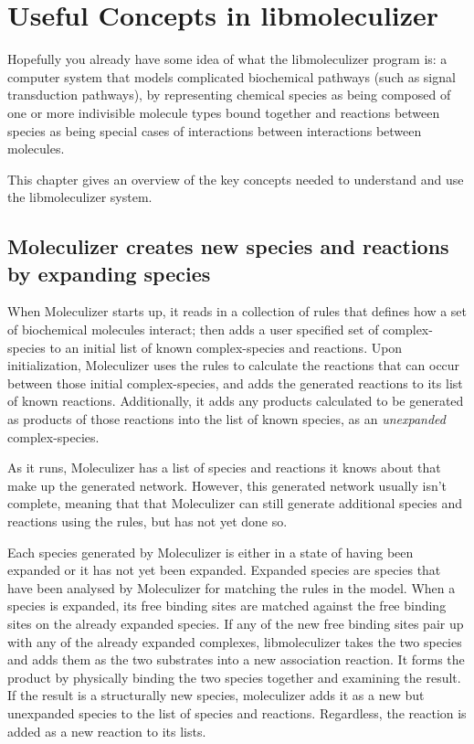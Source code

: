 \chapter{Useful Concepts in libmoleculizer}
\label{chap:conceptualOverviewChapter}

Hopefully you already have some idea of what the libmoleculizer
program is: a computer system that models complicated biochemical
pathways (such as signal transduction pathways), by representing chemical
species as being composed of one or more indivisible molecule types
bound together and reactions between species as being special cases of
interactions between interactions between molecules.  

This chapter gives an overview of the key concepts needed to
understand and use the libmoleculizer system.  

\section{Moleculizer creates new species and reactions by expanding
  species}

When Moleculizer starts up, it reads in a collection of rules that
defines how a set of biochemical molecules interact; then adds a user
specified set of complex-species to an initial list of known
complex-species and reactions.  Upon initialization, Moleculizer uses
the rules to calculate the reactions that can occur between those initial
complex-species, and adds the generated reactions to its list of
known reactions.  Additionally, it adds any products calculated to be
generated as products of those reactions into the list of known species,
as an {\it unexpanded} complex-species.

As it runs, Moleculizer has a list of species and reactions it
knows about that make up the generated network.  However, this
generated network usually isn't complete, meaning that that
Moleculizer can still generate additional species and reactions using
the rules, but has not yet done so.  

Each species generated by Moleculizer is either in a state of having
been expanded or it has not yet been expanded.  Expanded species are
species that have been analysed by Moleculizer for matching the rules
in the model.  When a species is expanded, its free binding sites are
matched against the free binding sites on the already expanded
species.  If any of the new free binding sites pair up with any of the
already expanded complexes, libmoleculizer takes the two species and
adds them as the two substrates into a new association reaction.  It
forms the product by physically binding the two species together and
examining the result.  If the result is a structurally new species,
moleculizer adds it as a new but unexpanded species to the list of
species and reactions.  Regardless, the reaction is added as a new
reaction to its lists.  

